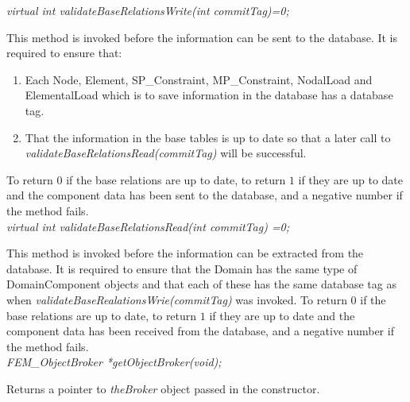 {\em virtual int validateBaseRelationsWrite(int commitTag)=0;}

This method is invoked before the information can be sent to the
database. It is required to ensure that: \begin{enumerate} 
\item Each Node, Element, SP\_Constraint, MP\_Constraint, NodalLoad and
ElementalLoad which is to save information in the database has a
database tag.
\item That the information in the base tables is up to date so that a
later call to {\em validateBaseRelationsRead(commitTag)} will be successful.
\end{enumerate}
\noindent To return $0$ if the base relations are up to date, to return
$1$ if they are up to date and the component data has been sent to the
database, and a negative number if the method fails. \\

{\em virtual int validateBaseRelationsRead(int commitTag) =0;}

This method is invoked before the information can be extracted from the
database. It is required to ensure that the Domain has the same
type of DomainComponent objects and that each of these has the same
database tag as when {\em validateBaseRealationsWrie(commitTag)} was
invoked.  To return $0$ if the base relations are up to date, to return
$1$ if they are up to date and the component data has been received from the
database, and a negative number if the method fails. \\

{\em FEM\_ObjectBroker *getObjectBroker(void);}

Returns a pointer to {\em theBroker} object passed in the constructor. 